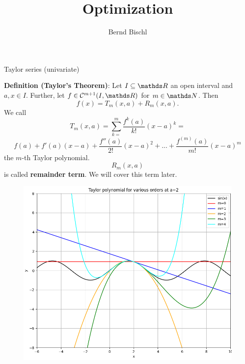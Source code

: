 



\usepackage{graphicx}


\newcommand{\titlefigure}{figure_man/Taylor2D/Taylor2D_1st100.png}
\newcommand{\learninggoals}{
\item Taylor series (Univariate)
\item Hessian Matrix
\item Taylor series (Multivariate)}



\title{Optimization}
\author{Bernd Bischl}
\date{}



\sloppy
   
\begin{vbframe}{Taylor series (univariate)}

    \textbf{Definition (Taylor's Theorem)}: Let $I \subseteq \R$ an open interval and $a, x \in I$. Further, let $f \in \mathcal{C}^{m+1}(I,\R)$ for $m \in \N$. Then
    $$f(x) = T_{m}(x,a) + R_{m}(x,a).$$
    We call
    $$T_{m}(x,a) = \sum_{k=}^{m} \frac{f^{k}(a)}{k!}(x-a)^{k} = $$
    $$f(a) + f'(a)(x-a) + \frac{f''(a)}{2!}(x-a)^{2} + ... + \frac{f^{(m)}(a)}{m!}(x-a)^{m}$$ the $m$-th Taylor polynomial.
    $$R_{m}(x,a)$$ is called \textbf{remainder term}. We will cover this term later.    

    \framebreak 
    
    \begin{figure}[htp]
        \centering
        \includegraphics[height=0.9\textheight]{figure_man/taylor_univariate.png}
    \end{figure}
    
\end{vbframe}

